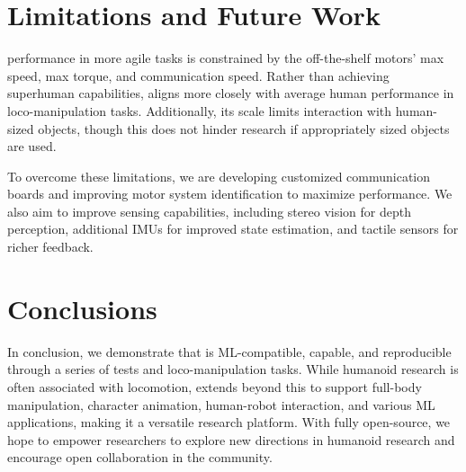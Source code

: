 \section{Limitations and Future Work}
\label{sec:conclusion}

\systems performance in more agile tasks is constrained by the off-the-shelf motors' max speed, max torque, and communication speed. Rather than achieving superhuman capabilities, \system aligns more closely with average human performance in loco-manipulation tasks. Additionally, its scale limits interaction with human-sized objects, though this does not hinder research if appropriately sized objects are used.

To overcome these limitations, we are developing customized communication boards and improving motor system identification to maximize performance. We also aim to improve sensing capabilities, including stereo vision for depth perception, additional IMUs for improved state estimation, and tactile sensors for richer feedback.


\section{Conclusions}

In conclusion, we demonstrate that \system is ML-compatible, capable, and reproducible through a series of tests and loco-manipulation tasks. While humanoid research is often associated with locomotion, \system extends beyond this to support full-body manipulation, character animation, human-robot interaction, and various ML applications, making it a versatile research platform. With \system fully open-source, we hope to empower researchers to explore new directions in humanoid research and encourage open collaboration in the community. 